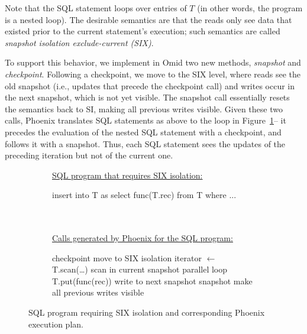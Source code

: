 Note that the SQL statement loops over entries of $T$ (in other words, the program is a nested loop). 
The desirable semantics are that the reads only see  data that existed prior to the 
current statement's execution; such semantics are called 
\emph{snapshot isolation exclude-current (SIX)}.

To support this behavior, we implement in Omid two new methods, {\em snapshot\/} and {\em checkpoint}.
Following a checkpoint, we move to the SIX level, where reads see the old snapshot (i.e., updates that
precede the checkpoint call) and writes occur in the next snapshot, which is not yet visible.
The snapshot call essentially resets the semantics back to SI, making all previous writes visible.
Given these two calls, Phoenix translates SQL statements as above to the loop in Figure~\ref{alg:six}-- 
it precedes the evaluation of the nested SQL statement with a checkpoint, and follows it with a snapshot.
Thus, each SQL statement sees the updates of the preceding iteration but not of the current one. 

\begin{figure}
\begin{subfigure}[tb]{\columnwidth}
\underline{\hspace{\columnwidth}}
\underline{\small SQL program that requires SIX isolation:}
\begin{algorithmic}
\State insert into T as select func(T.rec) from T  where ... 
\EndFor
\end{algorithmic}
\end{subfigure}
\begin{subfigure}[tb]{\columnwidth}
\ \\ \\
\underline{\small Calls generated by Phoenix for the SQL program:}
\begin{algorithmic}
\State checkpoint \Comment move to SIX isolation
\State iterator $\leftarrow$ T.scan(\dots) \Comment scan in current snapshot
 \Comment parallel loop
    \State T.put(func(rec)) \Comment write to next snapshot              
\EndFor
\State snapshot  \Comment make all previous writes visible
\EndFor
\end{algorithmic}
\underline{\hspace{\columnwidth}}
\end{subfigure}
\caption{  SQL program requiring SIX isolation and corresponding Phoenix execution plan.}
\label{alg:six}
\end{figure}

